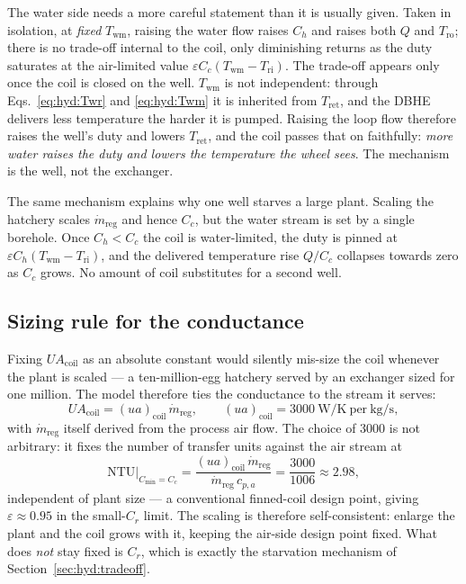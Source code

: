 \documentclass[11pt]{article}
\newcommand{\mdr}{\ensuremath{\dot m_{\mathrm{reg}}}}
\newcommand{\UA}{\ensuremath{U\!A}}
\begin{document}
The water side needs a more careful statement than it is usually given. Taken in isolation, at
\emph{fixed} $T_{\mathrm{wm}}$, raising the water flow raises $C_h$ and raises both $Q$ and
$T_{\mathrm{ro}}$; there is no trade-off internal to the coil, only diminishing returns as the
duty saturates at the air-limited value $\varepsilon C_c(T_{\mathrm{wm}}-T_{\mathrm{ri}})$. The
trade-off appears only once the coil is closed on the well. $T_{\mathrm{wm}}$ is not
independent: through Eqs.~\eqref{eq:hyd:Twr} and \eqref{eq:hyd:Twm} it is inherited from
$T_{\mathrm{ret}}$, and the DBHE delivers less temperature the harder it is pumped. Raising the
loop flow therefore raises the well's duty and lowers $T_{\mathrm{ret}}$, and the coil passes
that on faithfully: \emph{more water raises the duty and lowers the temperature the wheel
sees}. The mechanism is the well, not the exchanger.

The same mechanism explains why one well starves a large plant. Scaling the hatchery scales
$\mdr$ and hence $C_c$, but the water stream is set by a single borehole. Once $C_h<C_c$ the
coil is water-limited, the duty is pinned at $\varepsilon
C_h(T_{\mathrm{wm}}-T_{\mathrm{ri}})$, and the delivered temperature rise $Q/C_c$ collapses
towards zero as $C_c$ grows. No amount of coil substitutes for a second well.

\subsection{Sizing rule for the conductance}
\label{sec:hyd:sizing}

Fixing $\UA_{\mathrm{coil}}$ as an absolute constant would silently mis-size the coil whenever
the plant is scaled --- a ten-million-egg hatchery served by an exchanger sized for one
million. The model therefore ties the conductance to the stream it serves:
\begin{equation}
\UA_{\mathrm{coil}}=(ua)_{\mathrm{coil}}\,\mdr ,
\qquad
(ua)_{\mathrm{coil}}=\SI{3000}{\watt\per\kelvin}\ \text{per}\
\si{\kilogram\per\second},
\label{eq:hyd:UAcoil}
\end{equation}
with $\mdr$ itself derived from the process air flow. The choice of \num{3000} is not
arbitrary: it fixes the number of transfer units against the air stream at
\begin{equation}
\mathrm{NTU}\big|_{C_{\min}=C_c}
=\frac{(ua)_{\mathrm{coil}}\,\mdr}{\mdr\,c_{p,a}}
=\frac{\num{3000}}{\num{1006}}\approx\num{2.98},
\label{eq:hyd:NTUair}
\end{equation}
independent of plant size --- a conventional finned-coil design point, giving
$\varepsilon\approx\num{0.95}$ in the small-$C_r$ limit. The scaling is therefore
self-consistent: enlarge the plant and the coil grows with it, keeping the air-side design
point fixed. What does \emph{not} stay fixed is $C_r$, which is exactly the starvation
mechanism of Section~\ref{sec:hyd:tradeoff}.
\end{document}
